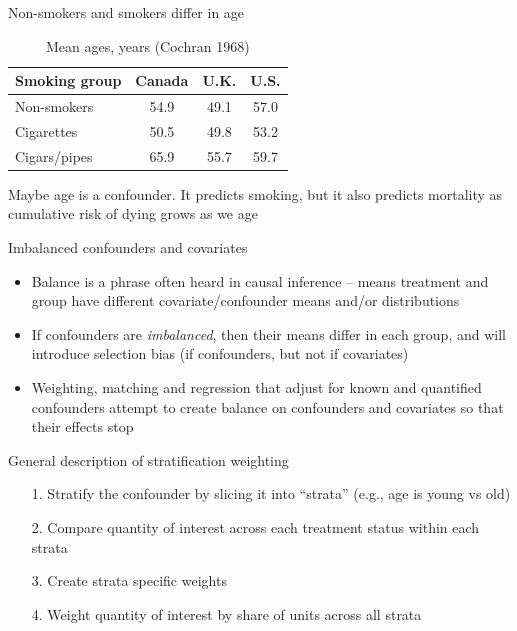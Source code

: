 \documentclass{beamer}
\begin{document}
\begin{frame}{Non-smokers and smokers differ in age}
	

	\begin{table}\centering
		\caption{Mean ages, years (Cochran 1968)}
		\begin{center}
		\begin{tabular}{lccc}
		\hline \hline
		\multicolumn{1}{l}{Smoking group}&
		\multicolumn{1}{c}{Canada}&
		\multicolumn{1}{c}{U.K.}&
		\multicolumn{1}{c}{U.S.}\\
		\hline
		Non-smokers & 54.9 & 49.1 & 57.0\\
		Cigarettes & 50.5 & 49.8 & 53.2 \\
		Cigars/pipes & 65.9 & 55.7 & 59.7\\
		\hline
		\end{tabular}
		\end{center}
	\end{table}
	
Maybe age is a confounder. It predicts smoking, but it also predicts mortality as cumulative risk of dying grows as we age
 
\end{frame}

\begin{frame}{Imbalanced confounders and covariates}

\begin{itemize}
\item Balance is a phrase often heard in causal inference -- means treatment and group have different covariate/confounder means and/or distributions
\item If confounders are \emph{imbalanced}, then their means differ in each group, and will introduce selection bias (if confounders, but not if covariates)
\item Weighting, matching and regression that adjust for known and quantified confounders attempt to create balance on confounders and covariates so that their effects stop
\end{itemize}

\end{frame}


\begin{frame}{General description of stratification weighting}
	

\begin{enumerate}
\item[1. ]Stratify the confounder by slicing it into ``strata'' (e.g., age is young vs old)
\item[2. ]Compare quantity of interest across each treatment status within each strata
\item[3. ]Create strata specific weights
\item[4. ]Weight quantity of interest by share of units across all strata
\end{enumerate}

\end{frame}
\end{document}
